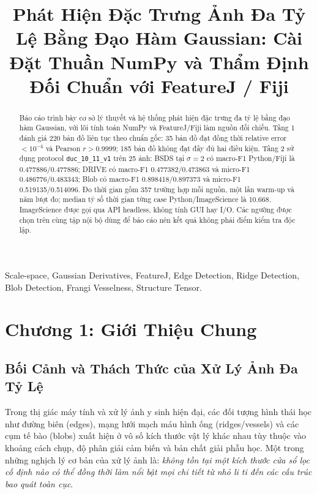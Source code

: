 \documentclass[conference]{IEEEtran}
\begin{document}
\title{Phát Hiện Đặc Trưng Ảnh Đa Tỷ Lệ Bằng Đạo Hàm Gaussian: Cài Đặt Thuần NumPy và Thẩm Định Đối Chuẩn với FeatureJ / Fiji}

\author{
}

\maketitle

\begin{abstract}
Báo cáo trình bày cơ sở lý thuyết và hệ thống phát hiện đặc trưng đa tỷ lệ bằng đạo hàm Gaussian, với lõi tính toán NumPy và FeatureJ/Fiji làm nguồn đối chiếu. Tầng 1 đánh giá 220 bản đồ liên tục theo chuẩn gốc: 35 bản đồ đạt đồng thời relative error $<10^{-4}$ và Pearson $r>0.9999$; 185 bản đồ không đạt đầy đủ hai điều kiện. Tầng 2 sử dụng protocol \texttt{duc\_10\_11\_v1} trên 25 ảnh: BSDS tại $\sigma=2$ có macro-F1 Python/Fiji là 0.477886/0.477886; DRIVE có macro-F1 0.477382/0.473863 và micro-F1 0.486776/0.483343; Blob có macro-F1 0.898418/0.897373 và micro-F1 0.519135/0.514096. Đo thời gian gồm 357 trường hợp mỗi nguồn, một lần warm-up và năm lượt đo; median tỷ số thời gian từng case Python/ImageScience là 10.668. ImageScience được gọi qua API headless, không tính GUI hay I/O. Các ngưỡng được chọn trên cùng tập nội bộ dùng để báo cáo nên kết quả không phải điểm kiểm tra độc lập.
\end{abstract}

\begin{IEEEkeywords}
Scale-space, Gaussian Derivatives, FeatureJ, Edge Detection, Ridge Detection, Blob Detection, Frangi Vesselness, Structure Tensor.
\end{IEEEkeywords}

\section{Chương 1: Giới Thiệu Chung}

\subsection{Bối Cảnh và Thách Thức của Xử Lý Ảnh Đa Tỷ Lệ}
Trong thị giác máy tính và xử lý ảnh y sinh hiện đại, các đối tượng hình thái học như đường biên (edges), mạng lưới mạch máu hình ống (ridges/vessels) và các cụm tế bào (blobs) xuất hiện ở vô số kích thước vật lý khác nhau tùy thuộc vào khoảng cách chụp, độ phân giải cảm biến và bản chất giải phẫu học. Một trong những nghịch lý cơ bản của xử lý ảnh là: \textit{không tồn tại một kích thước cửa sổ lọc cố định nào có thể đồng thời làm nổi bật mọi chi tiết từ nhỏ li ti đến các cấu trúc bao quát toàn cục}.
\end{document}
